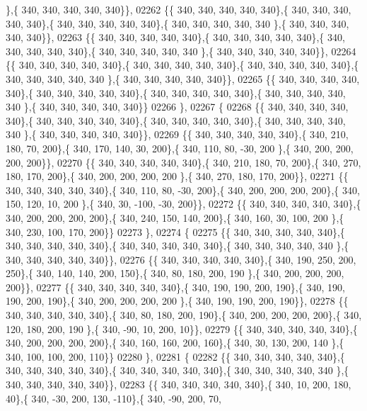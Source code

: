 \begin{DoxyCode}
      \},\{ 340, 340, 340, 340, 340\}\},
02262 \{\{ 340, 340, 340, 340, 340\},\{ 340, 340, 340, 340, 340\},\{ 340, 340, 340, 340, 340\},\{ 340, 340, 340, 340, 340
      \},\{ 340, 340, 340, 340, 340\}\},
02263 \{\{ 340, 340, 340, 340, 340\},\{ 340, 340, 340, 340, 340\},\{ 340, 340, 340, 340, 340\},\{ 340, 340, 340, 340, 340
      \},\{ 340, 340, 340, 340, 340\}\},
02264 \{\{ 340, 340, 340, 340, 340\},\{ 340, 340, 340, 340, 340\},\{ 340, 340, 340, 340, 340\},\{ 340, 340, 340, 340, 340
      \},\{ 340, 340, 340, 340, 340\}\},
02265 \{\{ 340, 340, 340, 340, 340\},\{ 340, 340, 340, 340, 340\},\{ 340, 340, 340, 340, 340\},\{ 340, 340, 340, 340, 340
      \},\{ 340, 340, 340, 340, 340\}\}
02266 \},
02267 \{
02268 \{\{ 340, 340, 340, 340, 340\},\{ 340, 340, 340, 340, 340\},\{ 340, 340, 340, 340, 340\},\{ 340, 340, 340, 340, 340
      \},\{ 340, 340, 340, 340, 340\}\},
02269 \{\{ 340, 340, 340, 340, 340\},\{ 340, 210, 180,  70, 200\},\{ 340, 170, 140,  30, 200\},\{ 340, 110,  80, -30, 200
      \},\{ 340, 200, 200, 200, 200\}\},
02270 \{\{ 340, 340, 340, 340, 340\},\{ 340, 210, 180,  70, 200\},\{ 340, 270, 180, 170, 200\},\{ 340, 200, 200, 200, 200
      \},\{ 340, 270, 180, 170, 200\}\},
02271 \{\{ 340, 340, 340, 340, 340\},\{ 340, 110,  80, -30, 200\},\{ 340, 200, 200, 200, 200\},\{ 340, 150, 120,  10, 200
      \},\{ 340,  30, -100, -30, 200\}\},
02272 \{\{ 340, 340, 340, 340, 340\},\{ 340, 200, 200, 200, 200\},\{ 340, 240, 150, 140, 200\},\{ 340, 160,  30, 100, 200
      \},\{ 340, 230, 100, 170, 200\}\}
02273 \},
02274 \{
02275 \{\{ 340, 340, 340, 340, 340\},\{ 340, 340, 340, 340, 340\},\{ 340, 340, 340, 340, 340\},\{ 340, 340, 340, 340, 340
      \},\{ 340, 340, 340, 340, 340\}\},
02276 \{\{ 340, 340, 340, 340, 340\},\{ 340, 190, 250, 200, 250\},\{ 340, 140, 140, 200, 150\},\{ 340,  80, 180, 200, 190
      \},\{ 340, 200, 200, 200, 200\}\},
02277 \{\{ 340, 340, 340, 340, 340\},\{ 340, 190, 190, 200, 190\},\{ 340, 190, 190, 200, 190\},\{ 340, 200, 200, 200, 200
      \},\{ 340, 190, 190, 200, 190\}\},
02278 \{\{ 340, 340, 340, 340, 340\},\{ 340,  80, 180, 200, 190\},\{ 340, 200, 200, 200, 200\},\{ 340, 120, 180, 200, 190
      \},\{ 340, -90,  10, 200,  10\}\},
02279 \{\{ 340, 340, 340, 340, 340\},\{ 340, 200, 200, 200, 200\},\{ 340, 160, 160, 200, 160\},\{ 340,  30, 130, 200, 140
      \},\{ 340, 100, 100, 200, 110\}\}
02280 \},
02281 \{
02282 \{\{ 340, 340, 340, 340, 340\},\{ 340, 340, 340, 340, 340\},\{ 340, 340, 340, 340, 340\},\{ 340, 340, 340, 340, 340
      \},\{ 340, 340, 340, 340, 340\}\},
02283 \{\{ 340, 340, 340, 340, 340\},\{ 340,  10, 200, 180,  40\},\{ 340, -30, 200, 130, -110\},\{ 340, -90, 200,  70,  

\end{DoxyCode}
